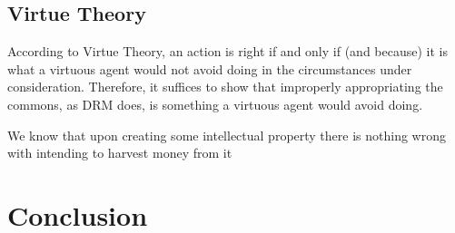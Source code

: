 \documentclass[12pt,letterpaper]{article}
\begin{document}
\subsection{Virtue Theory}
According to Virtue Theory, an action is right if and only if (and because) it is what a virtuous agent would not avoid doing in the circumstances under consideration.\autocite[\pno~25]{timmons_2017} Therefore, it suffices to show that improperly appropriating the commons, as DRM does, is something a virtuous agent would avoid doing.

We know that upon creating some intellectual property there is nothing wrong with intending to harvest money from it 

\section{Conclusion}

\newpage
\printbibliography[heading=bibintoc]
\end{document}
